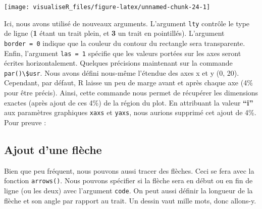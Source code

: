 \documentclass[]{article}
\newenvironment{Shaded}{\begin{snugshade}}{\end{snugshade}}
\newcommand{\CommentTok}[1]{\textcolor[rgb]{0.56,0.35,0.01}{\textit{#1}}}
\newcommand{\DataTypeTok}[1]{\textcolor[rgb]{0.13,0.29,0.53}{#1}}
\newcommand{\DecValTok}[1]{\textcolor[rgb]{0.00,0.00,0.81}{#1}}
\newcommand{\KeywordTok}[1]{\textcolor[rgb]{0.13,0.29,0.53}{\textbf{#1}}}
\newcommand{\NormalTok}[1]{#1}
\newcommand{\OperatorTok}[1]{\textcolor[rgb]{0.81,0.36,0.00}{\textbf{#1}}}
\newcommand{\StringTok}[1]{\textcolor[rgb]{0.31,0.60,0.02}{#1}}
\begin{document}
\begin{center}\texttt{[image: visualiseR\_files/figure-latex/unnamed-chunk-24-1]} \end{center}

Ici, nous avons utilisé de nouveaux arguments. L'argument \texttt{lty} contrôle le type de ligne (\textbf{1} étant un trait plein, et \textbf{3} un trait en pointillés). L'argument \texttt{border\ =\ 0} indique que la couleur du contour du rectangle sera transparente. Enfin, l'argument \texttt{las\ =\ 1} spécifie que les valeurs portées sur les axes seront écrites horizontalement.
Quelques précisions maintenant sur la commande \texttt{par()\textbackslash{}\$usr}. Nous avons défini nous-même l'étendue des axes x et y (0, 20). Cependant, par défaut, R laisse un peu de marge avant et après chaque axe (4\% pour être précis). Ainsi, cette commande nous permet de récupérer les dimensions exactes (après ajout de ces 4\%) de la région du plot. En attribuant la valeur \textbf{``i''} aux paramètres graphiques \texttt{xaxs} et \texttt{yaxs}, nous aurions supprimé cet ajout de 4\%. Pour preuve :

\begin{Shaded}
\end{Shaded}

\hypertarget{ajout-dune-fluxe8che}{%
\subsection{Ajout d'une flèche}\label{ajout-dune-fluxe8che}}

Bien que peu fréquent, nous pouvons aussi tracer des flèches. Ceci se fera avec la fonction \texttt{arrows()}. Nous pouvons spécifier si la flèche sera en début ou en fin de ligne (ou les deux) avec l'argument \texttt{code}. On peut aussi définir la longueur de la flèche et son angle par rapport au trait. Un dessin vaut mille mots, donc allons-y.
\end{document}
